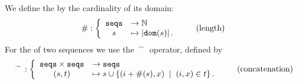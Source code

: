 \begin{definition}
\label{def_seqs_ops}
We define the  by the cardinality of its domain:
\begin{align}
\#: \left\{ \begin{array}{cl}
		 \texttt{seqs}&\rightarrow\mathbb N \\
		s&\mapsto\left|\texttt{dom}(s)\right|.
		\end{array}\right.
\tag{length}
\end{align}
For the  of two sequences we use the ${}^{\,\frown{}\,}{}$ operator, defined by
\begin{align}
\seqconc{}{}:\left\{ \begin{array}{cl}
		 \texttt{seqs}\times\texttt{seqs}&\rightarrow\texttt{seqs} \\
		  (s,t)&\mapsto{}s\cup\set[(i,x)\in{}t]{(i+\len{s},x)}.		
		\end{array}\right.
\tag{concatenation}
\end{align}

\end{definition}

